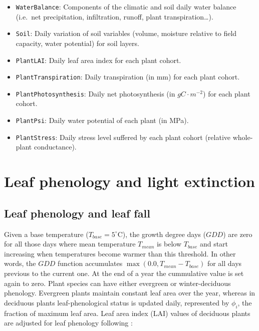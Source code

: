 \documentclass[]{book}
\providecommand{\tightlist}{%
  \setlength{\itemsep}{0pt}\setlength{\parskip}{0pt}}
\begin{document}
\begin{itemize}
\tightlist
\item
  \texttt{WaterBalance}: Components of the climatic and soil daily water balance (i.e.~net precipitation, infiltration, runoff, plant transpiration\ldots{}).
\item
  \texttt{Soil}: Daily variation of soil variables (volume, moisture relative to field capacity, water potential) for soil layers.
\item
  \texttt{PlantLAI}: Daily leaf area index for each plant cohort.
\item
  \texttt{PlantTranspiration}: Daily transpiration (in mm) for each plant cohort.
\item
  \texttt{PlantPhotosynthesis}: Daily net photosynthesis (in \(g C \cdot m^{-2}\)) for each plant cohort.
\item
  \texttt{PlantPsi}: Daily water potential of each plant (in MPa).
\item
  \texttt{PlantStress}: Daily stress level suffered by each plant cohort (relative whole-plant conductance).
\end{itemize}

\hypertarget{leaf-phenology-and-light-extinction}{%
\chapter{Leaf phenology and light extinction}\label{leaf-phenology-and-light-extinction}}

\hypertarget{leafphenology}{%
\section{Leaf phenology and leaf fall}\label{leafphenology}}

Given a base temperature (\(T_{base} = 5^{\circ} \mathrm{C}\)), the growth degree days (\(GDD\)) are zero for all those days where mean temperature \(T_{mean}\) is below \(T_{base}\) and start increasing when temperatures become warmer than this threshold. In other words, the \(GDD\) function accumulates \(\max(0.0, T_{mean} - T_{base})\) for all days previous to the current one. At the end of a year the cummulative value is set again to zero. Plant species can have either evergreen or winter-deciduous phenology. Evergreen plants maintain constant leaf area over the year, whereas in deciduous plants leaf-phenological status is updated daily, represented by \(\phi_i\), the fraction of maximum leaf area. Leaf area index (LAI) values of deciduous plants are adjusted for leaf phenology following \citep{Prentice1993, Sitch2003}:
\end{document}
